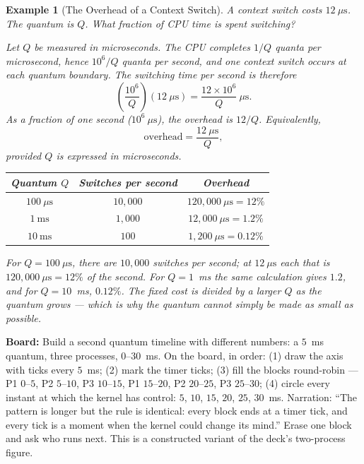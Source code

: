 \documentclass[11pt]{article}
\newtheorem{example}{Example}[section]
\begin{document}
\begin{example}[The Overhead of a Context Switch]
\label{ex:quantum}
A context switch costs $12\ \mu\text{s}$. The quantum is $Q$. What fraction of CPU time is spent switching?

Let $Q$ be measured in microseconds. The CPU completes $1/Q$ quanta per microsecond, hence $10^6/Q$ quanta per second, and one context switch occurs at each quantum boundary. The switching time per second is therefore
\[
  \left(\frac{10^6}{Q}\right)(12\ \mu\text{s}) = \frac{12\times 10^6}{Q}\ \mu\text{s}.
\]
As a fraction of one second ($10^6\ \mu\text{s}$), the overhead is $12/Q$. Equivalently,
\[
  \text{overhead} = \frac{12\ \mu\text{s}}{Q},
\]
provided $Q$ is expressed in microseconds.

\begin{center}
\renewcommand{\arraystretch}{1.35}
\begin{tabular}{c|c|c}
  \textbf{Quantum $Q$} & \textbf{Switches per second} & \textbf{Overhead} \\
  \hline
  $100\ \mu\text{s}$ & $10{,}000$ & $120{,}000\ \mu\text{s} = 12\%$ \\
  $1\ \text{ms}$     & $1{,}000$  & $12{,}000\ \mu\text{s} = 1.2\%$ \\
  $10\ \text{ms}$    & $100$      & $1{,}200\ \mu\text{s} = 0.12\%$ \\
\end{tabular}
\end{center}

For $Q=100\ \mu\text{s}$, there are $10{,}000$ switches per second; at $12\ \mu\text{s}$ each that is $120{,}000\ \mu\text{s}=12\%$ of the second. For $Q=1$~ms the same calculation gives $1.2$, and for $Q=10$~ms, $0.12\%$. The fixed cost is divided by a larger $Q$ as the quantum grows --- which is why the quantum cannot simply be made as small as possible.
\end{example}

\noindent\textbf{Board:} Build a second quantum timeline with different numbers: a $5$~ms quantum, three processes, $0$--$30$~ms. On the board, in order: (1) draw the axis with ticks every $5$~ms; (2) mark the timer ticks; (3) fill the blocks round-robin --- P1 $0$--$5$, P2 $5$--$10$, P3 $10$--$15$, P1 $15$--$20$, P2 $20$--$25$, P3 $25$--$30$; (4) circle every instant at which the kernel has control: $5$, $10$, $15$, $20$, $25$, $30$~ms. Narration: ``The pattern is longer but the rule is identical: every block ends at a timer tick, and every tick is a moment when the kernel could change its mind.'' Erase one block and ask who runs next. This is a constructed variant of the deck's two-process figure.
\end{document}
